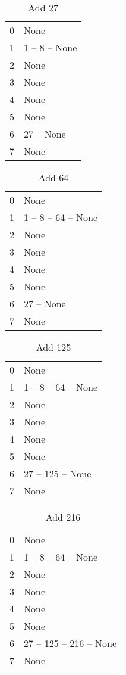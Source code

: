 \documentclass{article}
\begin{document}
		\begin{table}[]
			\centering
			\caption{Add 27}
			\begin{tabular}{ll}
				0& None\\
				1& 1 -- 8 -- None\\
				2& None\\
				3& None\\
				4& None\\
				5& None\\
				6& 27 -- None\\
				7& None\\
			\end{tabular}
		\end{table}
		
		\begin{table}[]
			\centering
			\caption{Add 64}
			\begin{tabular}{ll}
				0& None\\
				1& 1 -- 8 -- 64 -- None\\
				2& None\\
				3& None\\
				4& None\\
				5& None\\
				6& 27 -- None\\
				7& None\\
			\end{tabular}
		\end{table}
		
		
		\begin{table}[]
			\centering
			\caption{Add 125}
			\begin{tabular}{ll}
				0& None\\
				1& 1 -- 8 -- 64 -- None\\
				2& None\\
				3& None\\
				4& None\\
				5& None\\
				6& 27 -- 125 -- None\\
				7& None\\
			\end{tabular}
		\end{table}
		
				\begin{table}[]
					\centering
					\caption{Add 216}
					\begin{tabular}{ll}
						0& None\\
						1& 1 -- 8 -- 64 -- None\\
						2& None\\
						3& None\\
						4& None\\
						5& None\\
						6& 27 -- 125 -- 216 -- None\\
						7& None\\
					\end{tabular}
				\end{table}
				
\end{document}
